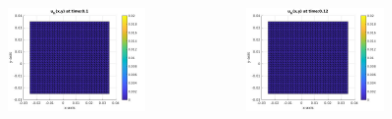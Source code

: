 \documentclass[9pt]{beamer}
\begin{document}
\begin{frame}
\begin{columns}
\begin{column}{0.25\textwidth}
    		\begin{figure}[h]
    			\includegraphics[width=\textwidth]{tc1-1/010.jpg}
    		\end{figure}
    	\end{column}
    	\begin{column}{0.25\textwidth}
    		\begin{figure}[h]
    			\includegraphics[width=\textwidth]{tc1-1/012.jpg}
    		\end{figure}
    	\end{column}
    	\begin{column}{0.25\textwidth}
    		\begin{figure}[h]

\end{figure}
\end{column}
\end{columns}
\end{frame}
\end{document}
